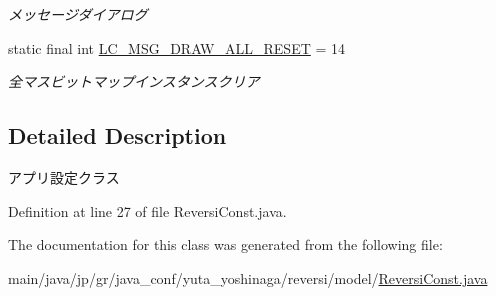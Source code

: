 \begin{DoxyCompactItemize}
\begin{DoxyCompactList}\small\item\em メッセージダイアログ \end{DoxyCompactList}\item 
\mbox{\label{classjp_1_1gr_1_1java__conf_1_1yuta__yoshinaga_1_1reversi_1_1model_1_1_reversi_const_a9b8cbe7b567984747ec216658c1823e3}} 
static final int \hyperlink{classjp_1_1gr_1_1java__conf_1_1yuta__yoshinaga_1_1reversi_1_1model_1_1_reversi_const_a9b8cbe7b567984747ec216658c1823e3}{L\+C\+\_\+\+M\+S\+G\+\_\+\+D\+R\+A\+W\+\_\+\+A\+L\+L\+\_\+\+R\+E\+S\+ET} = 14
\begin{DoxyCompactList}\small\item\em 全マスビットマップインスタンスクリア \end{DoxyCompactList}\end{DoxyCompactItemize}


\subsection{Detailed Description}
アプリ設定クラス 

Definition at line 27 of file Reversi\+Const.\+java.



The documentation for this class was generated from the following file\+:\begin{DoxyCompactItemize}
\item 
main/java/jp/gr/java\+\_\+conf/yuta\+\_\+yoshinaga/reversi/model/\hyperlink{_reversi_const_8java}{Reversi\+Const.\+java}\end{DoxyCompactItemize}
